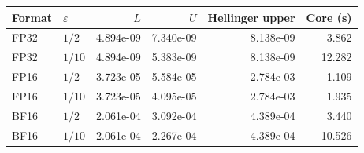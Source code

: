 \begin{tabular}{llrrrr}
\toprule
Format & $\varepsilon$ & $L$ & $U$ & Hellinger upper & Core (s) \\
\midrule
FP32 & $1/2$ & 4.894e-09 & 7.340e-09 & 8.138e-09 & 3.862 \\
FP32 & $1/10$ & 4.894e-09 & 5.383e-09 & 8.138e-09 & 12.282 \\
FP16 & $1/2$ & 3.723e-05 & 5.584e-05 & 2.784e-03 & 1.109 \\
FP16 & $1/10$ & 3.723e-05 & 4.095e-05 & 2.784e-03 & 1.935 \\
BF16 & $1/2$ & 2.061e-04 & 3.092e-04 & 4.389e-04 & 3.440 \\
BF16 & $1/10$ & 2.061e-04 & 2.267e-04 & 4.389e-04 & 10.526 \\
\bottomrule
\end{tabular}
